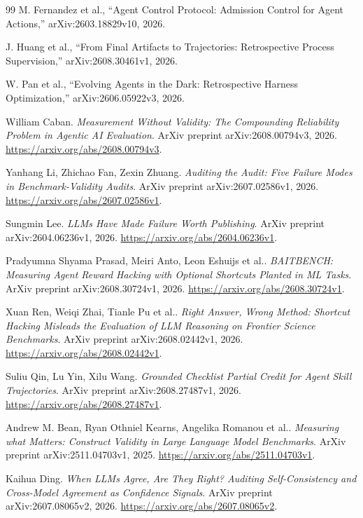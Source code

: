 \documentclass[11pt,a4paper]{article}
\begin{document}
\begin{thebibliography}{99}
M. Fernandez et al., ``Agent Control Protocol: Admission Control for Agent Actions,'' arXiv:2603.18829v10, 2026.

J. Huang et al., ``From Final Artifacts to Trajectories: Retrospective Process Supervision,'' arXiv:2608.30461v1, 2026.

W. Pan et al., ``Evolving Agents in the Dark: Retrospective Harness Optimization,'' arXiv:2606.05922v3, 2026.

William Caban.
\emph{Measurement Without Validity: The Compounding Reliability Problem in Agentic AI Evaluation}.
ArXiv preprint arXiv:2608.00794v3, 2026.
\url{https://arxiv.org/abs/2608.00794v3}.

Yanhang Li, Zhichao Fan, Zexin Zhuang.
\emph{Auditing the Audit: Five Failure Modes in Benchmark-Validity Audits}.
ArXiv preprint arXiv:2607.02586v1, 2026.
\url{https://arxiv.org/abs/2607.02586v1}.

Sungmin Lee.
\emph{LLMs Have Made Failure Worth Publishing}.
ArXiv preprint arXiv:2604.06236v1, 2026.
\url{https://arxiv.org/abs/2604.06236v1}.

Pradyumna Shyama Prasad, Meiri Anto, Leon Eshuijs et al..
\emph{BAITBENCH: Measuring Agent Reward Hacking with Optional Shortcuts Planted in ML Tasks}.
ArXiv preprint arXiv:2608.30724v1, 2026.
\url{https://arxiv.org/abs/2608.30724v1}.

Xuan Ren, Weiqi Zhai, Tianle Pu et al..
\emph{Right Answer, Wrong Method: Shortcut Hacking Misleads the Evaluation of LLM Reasoning on Frontier Science Benchmarks}.
ArXiv preprint arXiv:2608.02442v1, 2026.
\url{https://arxiv.org/abs/2608.02442v1}.

Suliu Qin, Lu Yin, Xilu Wang.
\emph{Grounded Checklist Partial Credit for Agent Skill Trajectories}.
ArXiv preprint arXiv:2608.27487v1, 2026.
\url{https://arxiv.org/abs/2608.27487v1}.

Andrew M. Bean, Ryan Othniel Kearns, Angelika Romanou et al..
\emph{Measuring what Matters: Construct Validity in Large Language Model Benchmarks}.
ArXiv preprint arXiv:2511.04703v1, 2025.
\url{https://arxiv.org/abs/2511.04703v1}.

Kaihua Ding.
\emph{When LLMs Agree, Are They Right? Auditing Self-Consistency and Cross-Model Agreement as Confidence Signals}.
ArXiv preprint arXiv:2607.08065v2, 2026.
\url{https://arxiv.org/abs/2607.08065v2}.


\end{thebibliography}
\end{document}
